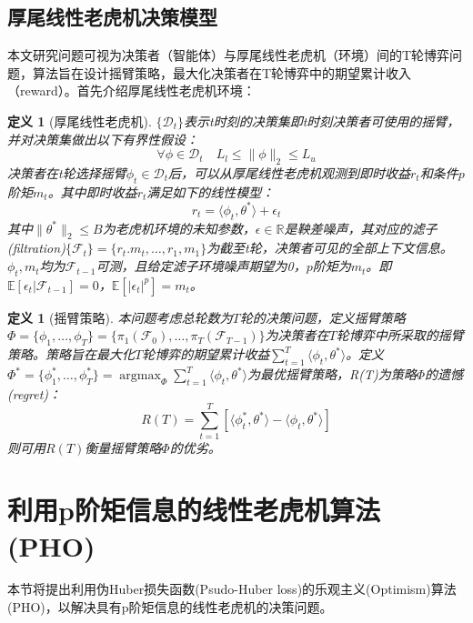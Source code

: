 \documentclass[UTF8,a4paper,10.5pt]{ctexart}
\newcommand{\Dcal}{\mathcal D}
\newcommand{\Fcal}{\mathcal F}
\newcommand{\E}{\mathbb{E}}
\newcommand{\R}{\mathbb{R}}
\newcommand{\argmax}{\mathop{\arg\max}}
\newtheorem{definition}[theorem]{定义}
\begin{document}
\subsection{厚尾线性老虎机决策模型}
本文研究问题可视为决策者（智能体）与厚尾线性老虎机（环境）间的T轮博弈问题，算法旨在设计摇臂策略，最大化决策者在T轮博弈中的期望累计收入（reward）。首先介绍厚尾线性老虎机环境：
\begin{definition}[厚尾线性老虎机]
	$\{\Dcal_t\}$表示t时刻的决策集即t时刻决策者可使用的摇臂，并对决策集做出以下有界性假设：
	\begin{equation}
		\forall \phi \in \Dcal_t \quad L_l\leq \|\phi\|_2\leq L_u
	\end{equation}
	决策者在t轮选择摇臂$\phi_t\in \Dcal_t$后，可以从厚尾线性老虎机观测到即时收益$r_t$和条件$p$阶矩$m_t$。其中即时收益$r_t$满足如下的线性模型：
	\begin{equation}
		r_t = \langle \phi_t, \theta^*\rangle +\epsilon_t
		\label{reward model}
	\end{equation}
	其中$\|\theta^*\|_2\leq B$为老虎机环境的未知参数，$\epsilon \in \R$是鞅差噪声，其对应的滤子(filtration)$\{\Fcal_t\} = \{r_t.m_t,\ldots,r_1,m_1\}$为截至t轮，决策者可见的全部上下文信息。$\phi_t,m_t$均为$\Fcal_{t-1}$可测，且给定滤子环境噪声期望为0，$p$阶矩为$m_t$。即$\E[\epsilon_t|\Fcal_{t-1}] =0 $，$\E[|\epsilon_t|^p] = m_t$。
\end{definition}

\begin{definition}[摇臂策略]
	本问题考虑总轮数为$T$轮的决策问题，定义摇臂策略$\Phi = \{\phi_1, \ldots, \phi_T\} = \{\pi_1(\Fcal_{0}), \ldots, \pi_T(\Fcal_{T-1})\}$为决策者在$T$轮博弈中所采取的摇臂策略。策略旨在最大化$T$轮博弈的期望累计收益$\sum_{t=1}^T\langle \phi_t, \theta^*\rangle$。定义$\Phi^* = \{\phi_1^*, \ldots, \phi_T^*\} = \argmax_{\Phi} \sum_{t=1}^T\langle \phi_t, \theta^*\rangle$为最优摇臂策略，R(T)为策略$\Phi$的遗憾(regret)：
	\begin{equation}
		R(T) = \sum_{t=1}^T \left[\langle \phi^*_t,\theta^*\rangle - \langle \phi_t, \theta^* \rangle \right]
	\end{equation}
	则可用$R(T)$衡量摇臂策略$\Phi$的优劣。
\end{definition}
\section{利用p阶矩信息的线性老虎机算法(PHO)}
本节将提出利用伪Huber损失函数(Psudo-Huber loss)的乐观主义(Optimism)算法(PHO)，以解决具有p阶矩信息的线性老虎机的决策问题。
\end{document}
